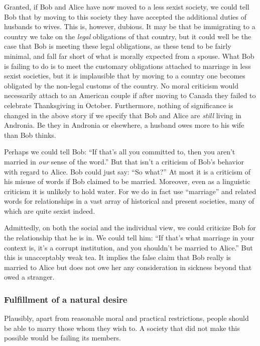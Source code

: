 Granted, if Bob and Alice have now moved to a less sexist society, we could tell Bob that by moving to this society they have accepted the additional
duties of husbands to wives. This is, however, dubious. It may be that be immigrating to a country we take on the \textit{legal} obligations of that
country, but it could well be the case that Bob is meeting these legal obligations, as these tend to be fairly minimal, and fall far short of what is morally expected from a spouse. What Bob is failing to do is
to meet the customary obligations attached to marriage in less sexist societies, but it is implausible that by moving to a country one becomes obligated
by the non-legal customs of the country. No moral criticism would necessarily attach to an American couple if after moving to Canada they failed to celebrate
Thanksgiving in October. Furthermore, nothing of significance is changed in the above story if we specify that Bob and Alice are \textit{still} living in
Andronia. Be they in Andronia or elsewhere, a husband owes more to his wife than Bob thinks.

Perhaps we could tell Bob: ``If that's all you committed to, then you aren't married in \textit{our} sense of the word.''
But that isn't a criticism of Bob's behavior with regard to Alice. Bob could just say: ``So what?'' At most it is a criticism of his misuse of words if Bob
claimed to be  married. Moreover, even as a linguistic criticism it is unlikely to hold water. For we do in fact use ``marriage'' and related words for relationships in
a vast array of historical and present societies, many of which are quite sexist indeed.

Admittedly, on both the social and the individual view, we could criticize Bob for the relationship that he is in. We could tell him: ``If that's what marriage
in your context is, it's a corrupt institution, and you shouldn't be married to Alice.'' But this is unacceptably weak tea. It implies the false claim that Bob really is married to Alice but does
not owe her any consideration in sickness beyond that owed a stranger.

\subsubsection{Fulfillment of a natural desire}\label{sec:natdesire}
Plausibly, apart from reasonable moral and practical restrictions, people should be able to marry those whom they wish to. A society that did not make this
possible would be failing its members.

